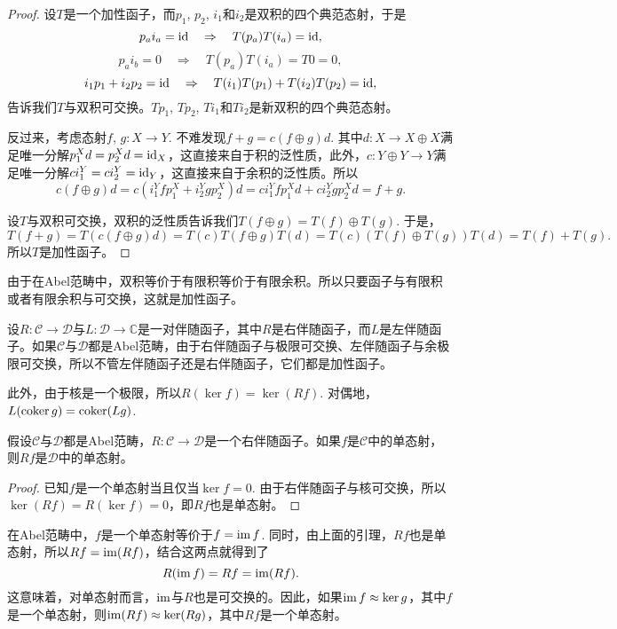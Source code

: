 \begin{proof}
设$T$是一个加性函子，而$p_1$, $p_2$, $i_1$和$i_2$是双积的四个典范态射，于是
\[
	p_ai_a = \operatorname{id} \quad \Rightarrow \quad T(p_a)T(i_a) = \operatorname{id},
\]
\[
	p_ai_b = 0 \quad \Rightarrow \quad T(p_a)T(i_a) = T0=0,
\]
\[
	i_1p_1+i_2p_2 = \operatorname{id} \quad \Rightarrow \quad T(i_1)T(p_1)+T(i_2)T(p_2) = \operatorname{id},
\]
告诉我们$T$与双积可交换。$Tp_1$, $Tp_2$, $Ti_1$和$Ti_2$是新双积的四个典范态射。

反过来，考虑态射$f$, $g:X\to Y$. 不难发现$f+g=c(f\oplus g)d$. 其中$d:X\to X\oplus X$满足唯一分解$p^X_1d=p^X_2d=\operatorname{id}_X$，这直接来自于积的泛性质，此外，$c:Y\oplus Y\to Y$满足唯一分解$ci^Y_1=ci^Y_2=\operatorname{id}_Y$，这直接来自于余积的泛性质。所以
\[
	c(f\oplus g)d=c(i_1^Y f p_1^X+i_2^Y g p_2^X)d=c i_1^Y f p_1^X d+ ci_2^Y g p_2^Xd=f+g.
\]

设$T$与双积可交换，双积的泛性质告诉我们$T(f\oplus g)=T(f)\oplus T(g)$. 于是，
\[
	T(f+g)=T(c(f\oplus g)d)=T(c)T(f\oplus g)T(d)=T(c)(T(f)\oplus T(g))T(d)=T(f)+T(g).
\]
所以$T$是加性函子。
\end{proof}

由于在Abel范畴中，双积等价于有限积等价于有限余积。所以只要函子与有限积或者有限余积与可交换，这就是加性函子。

\begin{para}
设$R:\mathcal{C}\to \mathcal{D}$与$L:\mathcal{D}\to \mathbb{C}$是一对伴随函子，其中$R$是右伴随函子，而$L$是左伴随函子。如果$\mathcal{C}$与$\mathcal{D}$都是Abel范畴，由于右伴随函子与极限可交换、左伴随函子与余极限可交换，所以不管左伴随函子还是右伴随函子，它们都是加性函子。

此外，由于核是一个极限，所以$R(\ker f)= \ker(Rf)$. 对偶地，$L(\operatorname{coker} g)= \operatorname{coker}(Lg)$.
\end{para}

\begin{lem}
假设$\mathcal{C}$与$\mathcal{D}$都是Abel范畴，$R:\mathcal{C}\to \mathcal{D}$是一个右伴随函子。如果$f$是$\mathcal{C}$中的单态射，则$Rf$是$\mathcal{D}$中的单态射。
\end{lem}

\begin{proof}
已知$f$是一个单态射当且仅当$\ker f=0$. 由于右伴随函子与核可交换，所以$\ker(Rf)= R(\ker f)=0$，即$Rf$也是单态射。
\end{proof}

在Abel范畴中，$f$是一个单态射等价于$f=\operatorname{im} f$. 同时，由上面的引理，$Rf$也是单态射，所以$Rf=\operatorname{im}(Rf)$，结合这两点就得到了
\[
	R(\operatorname{im} f)=Rf=\operatorname{im}(Rf).
\]
这意味着，对单态射而言，$\operatorname{im}$与$R$也是可交换的。因此，如果$\operatorname{im} f\approx \ker g$，其中$f$是一个单态射，则$\operatorname{im}(Rf)\approx \ker(Rg)$，其中$Rf$是一个单态射。

